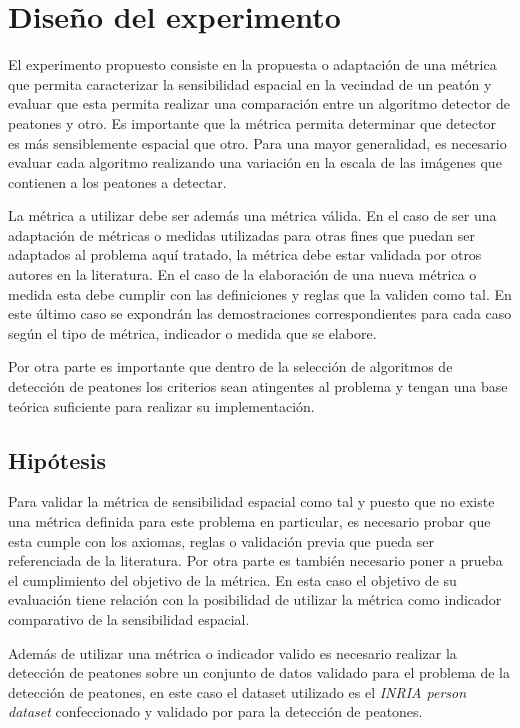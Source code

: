 \chapter{Diseño del experimento}
\label{cap:experimento}

El experimento propuesto consiste en la propuesta o adaptación de una métrica que permita caracterizar la sensibilidad espacial en la vecindad de un peatón y evaluar que esta permita realizar una comparación entre un algoritmo detector de peatones y otro. Es importante que la métrica permita determinar que detector es más sensiblemente espacial que otro. Para una mayor generalidad, es necesario evaluar cada algoritmo realizando una variación en la escala de las imágenes que contienen a los peatones a detectar.

La métrica a utilizar debe ser además una métrica válida. En el caso de ser una adaptación de métricas o medidas utilizadas para otras fines que puedan ser adaptados al problema aquí tratado, la métrica debe estar validada por otros autores en la literatura. En el caso de la elaboración de una nueva métrica o medida esta debe cumplir con las definiciones y reglas que la validen como tal. En este último caso se expondrán las demostraciones correspondientes para cada caso según el tipo de métrica, indicador o medida que se elabore.

Por otra parte es importante que dentro de la selección de algoritmos de detección de peatones los criterios sean atingentes al problema y tengan una base teórica suficiente para realizar su implementación.

\section{Hipótesis}
\label{experimento:hipotesis}

Para validar la métrica de sensibilidad espacial como tal y puesto que no existe una métrica definida para este problema en particular, es necesario probar que esta cumple con los axiomas, reglas o validación previa que pueda ser referenciada de la literatura. Por otra parte es también necesario poner a prueba el cumplimiento del objetivo de la métrica. En esta caso el objetivo de su evaluación tiene relación con la posibilidad de utilizar la métrica como indicador comparativo de la sensibilidad espacial. 

Además de utilizar una métrica o indicador valido es necesario realizar la detección de peatones sobre un conjunto de datos validado para el problema de la detección de peatones, en este caso el dataset utilizado es el \textit{INRIA person dataset} confeccionado y validado por \cite{dalal2006} para la detección de peatones. 

